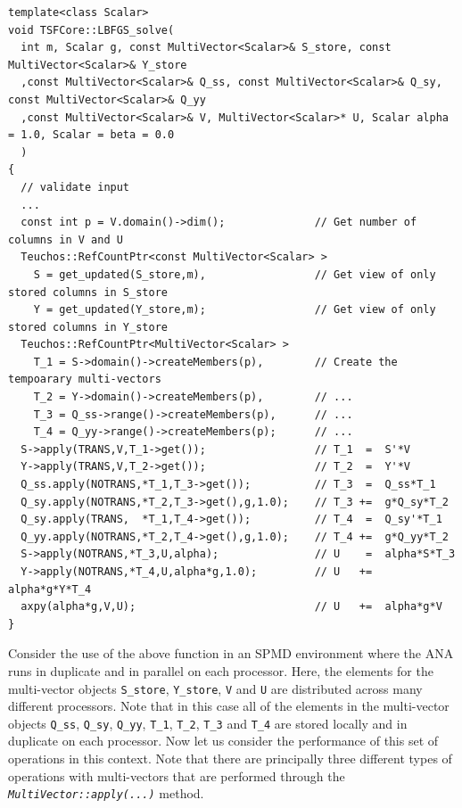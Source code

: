 {\scriptsize\begin{verbatim}
template<class Scalar>
void TSFCore::LBFGS_solve(
  int m, Scalar g, const MultiVector<Scalar>& S_store, const MultiVector<Scalar>& Y_store
  ,const MultiVector<Scalar>& Q_ss, const MultiVector<Scalar>& Q_sy, const MultiVector<Scalar>& Q_yy
  ,const MultiVector<Scalar>& V, MultiVector<Scalar>* U, Scalar alpha = 1.0, Scalar = beta = 0.0
  )
{
  // validate input
  ...
  const int p = V.domain()->dim();              // Get number of columns in V and U
  Teuchos::RefCountPtr<const MultiVector<Scalar> >
    S = get_updated(S_store,m),                 // Get view of only stored columns in S_store
    Y = get_updated(Y_store,m);                 // Get view of only stored columns in Y_store
  Teuchos::RefCountPtr<MultiVector<Scalar> >
    T_1 = S->domain()->createMembers(p),        // Create the tempoarary multi-vectors
    T_2 = Y->domain()->createMembers(p),        // ...
    T_3 = Q_ss->range()->createMembers(p),      // ...
    T_4 = Q_yy->range()->createMembers(p);      // ...
  S->apply(TRANS,V,T_1->get());                 // T_1  =  S'*V
  Y->apply(TRANS,V,T_2->get());                 // T_2  =  Y'*V
  Q_ss.apply(NOTRANS,*T_1,T_3->get());          // T_3  =  Q_ss*T_1
  Q_sy.apply(NOTRANS,*T_2,T_3->get(),g,1.0);    // T_3 +=  g*Q_sy*T_2
  Q_sy.apply(TRANS,  *T_1,T_4->get());          // T_4  =  Q_sy'*T_1
  Q_yy.apply(NOTRANS,*T_2,T_4->get(),g,1.0);    // T_4 +=  g*Q_yy*T_2
  S->apply(NOTRANS,*T_3,U,alpha);               // U    =  alpha*S*T_3
  Y->apply(NOTRANS,*T_4,U,alpha*g,1.0);         // U   +=  alpha*g*Y*T_4
  axpy(alpha*g,V,U);                            // U   +=  alpha*g*V
}
\end{verbatim}}

Consider the use of the above function in an SPMD environment where
the ANA runs in duplicate and in parallel on each processor.  Here,
the elements for the multi-vector objects \texttt{S\_store},
\texttt{Y\_store}, \texttt{V} and \texttt{U} are distributed across
many different processors.  Note that in this case all of the elements
in the multi-vector objects \texttt{Q\_ss}, \texttt{Q\_sy}, \texttt{Q\_yy},
\texttt{T\_1}, \texttt{T\_2}, \texttt{T\_3} and \texttt{T\_4} are stored
locally and in duplicate on each processor.  Now let us consider the
performance of this set of operations in this context.  Note that
there are principally three different types of operations with
multi-vectors that are performed through the
\texttt{\textit{Multi\-Vector\-::apply(\-...)}} method.

